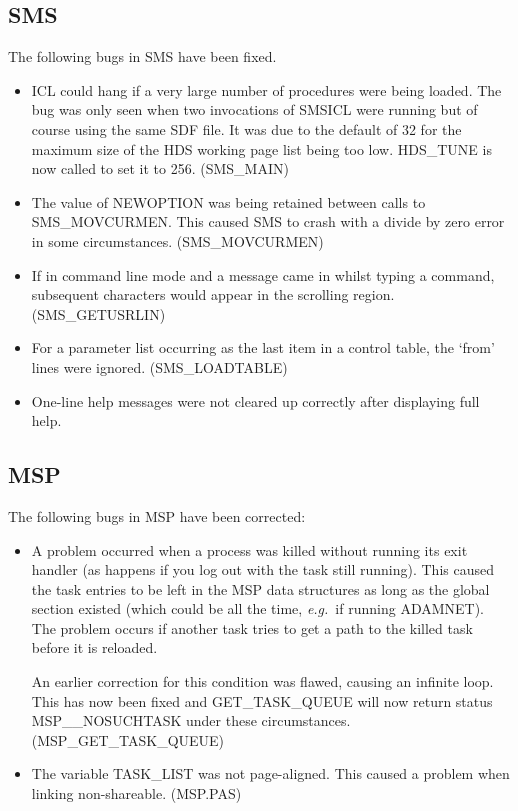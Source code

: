 \subsection{SMS}
\label{smsbugs}
The following bugs in SMS have been fixed.
\begin{itemize}
\item ICL could hang if a very large number of procedures were being loaded. 
The bug was only seen when two invocations of SMSICL were running but of 
course using the same SDF file.
It was due to the default of 32 for the maximum size of the  HDS working page 
list being too low.
HDS\_TUNE is now called to set it to 256. (SMS\_MAIN)
\item The value of NEWOPTION was being retained between calls to
SMS\_MOVCURMEN.
This caused SMS to crash with a divide by zero error in some circumstances.
(SMS\_MOVCURMEN)
\item If in command line mode and a message came in whilst typing a command, 
subsequent characters would appear in the scrolling region.
(SMS\_GETUSRLIN)
\item For a parameter list occurring as the last item in a control table,
the `from' lines were ignored.
(SMS\_LOADTABLE)
\item One-line help messages were not cleared up correctly after displaying
full help.
\end{itemize}

\subsection{MSP}
The following bugs in MSP have been corrected:
\begin{itemize}
\item A problem occurred when a process was killed without running its exit 
handler (as happens if you log out with the task still running). 
This caused the task entries to be left in the MSP data structures as long 
as the global section existed (which could be all the time, {\em e.g.}\ if 
running ADAMNET)\@.
The problem occurs if another task tries to get a path to the killed task 
before it is reloaded. 

An earlier correction for this condition was flawed, causing an infinite loop.
This has now been fixed and GET\_TASK\_QUEUE will now return status 
MSP\_\_NOSUCHTASK under these circumstances.
(MSP\_GET\_TASK\_QUEUE)

\item The variable TASK\_LIST was not page-aligned. This caused a problem when
linking non-shareable. (MSP.PAS)
\end{itemize}


